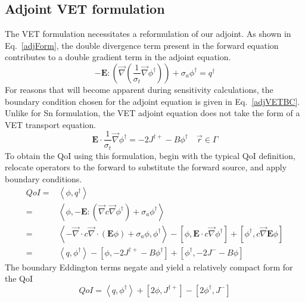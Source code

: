 \documentclass{article}
\newcommand{\vr}{\vec{r}}
\newcommand{\bra}{\left\langle}
\newcommand{\ket}{\right\rangle}
\newcommand{\sbra}{\left[}
\newcommand{\sket}{\right]}
\newcommand{\vdiv}{\vec{\nabla} \cdot}
\newcommand{\vgrad}{\vec{\nabla}}
\newcommand{\Edd}{\mathbf{E}}
\newcommand{\sigt}{\sigma_t}
\newcommand{\siga}{\sigma_a}
\newcommand{\isigt}{c}
\newcommand{\scalSource}{q}
\newcommand{\scalResp}{q^\dag}
\begin{document}
\subsection{Adjoint VET formulation}

The VET formulation necessitates a reformulation of our adjoint. As shown in Eq.~\eqref{adjForm}, the double divergence term present in the forward equation contributes to a double gradient term in the adjoint equation.
\begin{equation}
\label{adjForm}
- \Edd : \left( \vgrad \left( \frac{1}{\sigt}\vgrad \phi^\dag \right) \right) + \siga \phi^\dag = \scalResp
\end{equation}
For reasons that will become apparent during sensitivity calculations, the boundary condition chosen for the adjoint equation is given in Eq.~\eqref{adjVETBC}. Unlike for Sn formulation, the VET adjoint equation does not take the form of a VET transport equation.
\begin{equation}
\label{adjVETBC}
\Edd \cdot \frac{1}{\sigma_{t} } \vec{\nabla} \phi^\dag  = - 2J^{\dag +} - B \phi^\dag \quad \vr \in \Gamma
\end{equation}
To obtain the QoI using this formulation, begin with the typical QoI definition, relocate operators to the forward to substitute the forward source, and apply boundary conditions.
\begin{equation}
\label{VETQoIAdjUnpDeriv}
\begin{split}
QoI=&\bra \phi , \scalResp \ket \\
=&\bra \phi , - \Edd : \left( \vgrad \isigt \vgrad \phi^\dag \right) + \siga \phi^\dag \ket \\
=& \bra - \vdiv \isigt \vdiv \left( \Edd \phi \right) + \siga \phi, \phi^\dag \ket 
- \sbra \phi, \Edd \cdot \isigt \vgrad \phi^\dag \sket  
+ \sbra \phi^\dag, \isigt \vgrad \Edd \phi \sket \\
=&\bra \scalSource , \phi^\dag \ket 
- \sbra \phi , - 2J^{\dag +} - B \phi^\dag \sket + \sbra \phi^\dag, - 2J^- - B \phi  \sket
\end{split}
\end{equation}
The boundary Eddington terms negate and yield a relatively compact form for the QoI
\begin{equation}
\label{VETQoIAdj}
QoI=\bra \scalSource , \phi^\dag \ket 
+ \sbra 2\phi, J^{\dag +} \sket  - \sbra 2\phi^\dag, J^- \sket
\end{equation}
\end{document}
